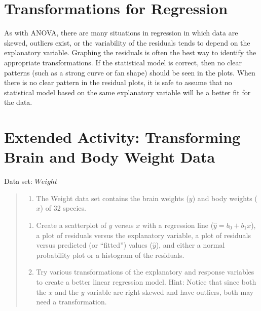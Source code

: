 \documentclass[
]{report}
\providecommand{\tightlist}{%
  \setlength{\itemsep}{0pt}\setlength{\parskip}{0pt}}
\begin{document}
\hypertarget{transformations-for-regression}{%
\section*{Transformations for Regression}\label{transformations-for-regression}}

As with ANOVA, there are many situations in regression in which data are skewed, outliers exist, or the variability of the residuals tends to depend on the explanatory variable. Graphing the residuals is often the best way to identify the appropriate transformations. If the statistical model is correct, then no clear patterns (such as a strong curve or fan shape) should be seen in the plots. When there is no clear pattern in the residual plots, it is safe to assume that no statistical model based on the same explanatory variable will be a better fit for the data.

\hypertarget{extended-activity-transforming-brain-and-body-weight-data}{%
\section*{Extended Activity: Transforming Brain and Body Weight Data}\label{extended-activity-transforming-brain-and-body-weight-data}}

Data set: \(Weight\)

\begin{quote}
\begin{enumerate}
\def\labelenumi{\arabic{enumi}.}
\setcounter{enumi}{31}
\tightlist
\item
  The Weight data set contains the brain weights (\(y\)) and body weights (\(x\)) of 32 species.\\
\end{enumerate}

\begin{enumerate}
\def\labelenumi{\alph{enumi}.}
\tightlist
\item
  Create a scatterplot of \(y\) versus \(x\) with a regression line (\(\hat{y} = b_0 + b_1x\)), a plot of residuals versus the explanatory variable, a plot of residuals versus predicted (or ``fitted'') values (\(\hat{y}\)), and either a normal probability plot or a histogram of the residuals.\\
\item
  Try various transformations of the explanatory and response variables to create a better linear regression model. Hint: Notice that since both the \(x\) and the \(y\) variable are right skewed and have outliers, both may need a transformation.
\end{enumerate}
\end{quote}
\end{document}
